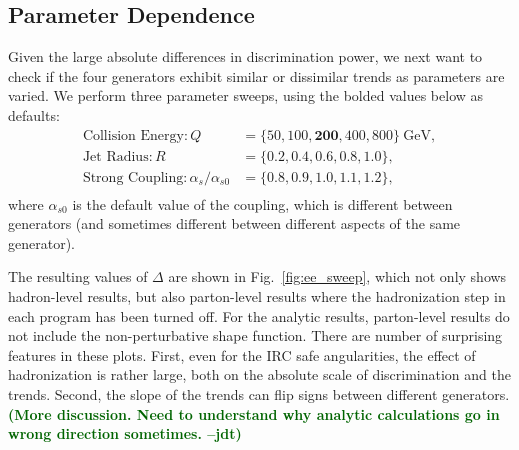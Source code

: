 \documentclass[11pt,letterpaper]{article}
\newcommand{\GeV}{\text{GeV}}
\DeclareRobustCommand{\Fig}[1]{Fig.~\ref{#1}}
\newcommand{\be}{\begin{equation}}
\newcommand{\ee}{\end{equation}}
\newcommand{\jdt}[1]{\textbf{\textcolor{darkgreen}{(#1 --jdt)}}}
\begin{document}
\subsection{Parameter Dependence}
\label{sec:ee_scales}

Given the large absolute differences in discrimination power, we next want to check if the four generators exhibit similar or dissimilar trends as parameters are varied.  We perform three parameter sweeps, using the bolded values below as defaults:
\be
\begin{aligned}
\text{Collision Energy}: Q &= \{ 50, 100, \mathbf{200}, 400, 800\}~\GeV, \\
\text{Jet Radius}: R &= \{ 0.2, 0.4, \mathbf{0.6}, 0.8, 1.0\}, \\
\text{Strong Coupling}: \alpha_s / \alpha_{s0} &= \{0.8,0.9,\mathbf{1.0},1.1,1.2\}, \\
\end{aligned}
\ee
where $\alpha_{s0}$ is the default value of the coupling, which is different between generators (and sometimes different between different aspects of the same generator).

The resulting values of $\Delta$ are shown in \Fig{fig:ee_sweep}, which not only shows hadron-level results, but also parton-level results where the hadronization step in each program has been turned off.  For the analytic results, parton-level results do not include the non-perturbative shape function.   There are number of surprising features in these plots.  First, even for the IRC safe angularities, the effect of hadronization is rather large, both on the absolute scale of discrimination and the trends.  Second, the slope of the trends can flip signs between different generators.  \jdt{More discussion.  Need to understand why analytic calculations go in wrong direction sometimes.}
\end{document}
